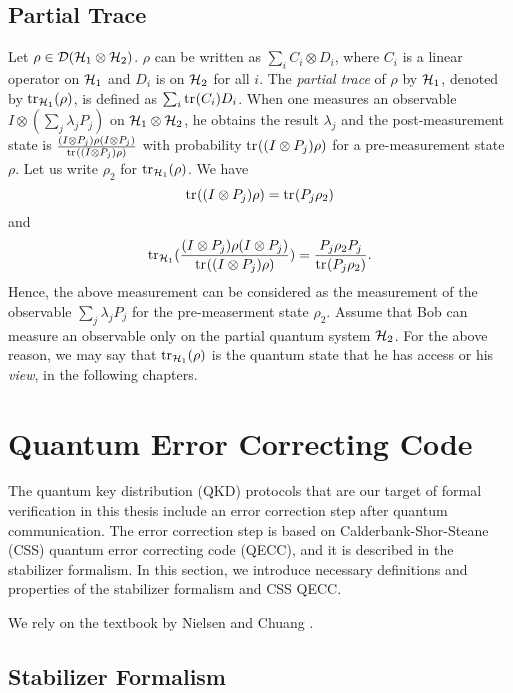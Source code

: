 \subsection*{Partial Trace}
Let $\rho \in \mathcal{D}(\mathcal{H}_1 \otimes \mathcal{H}_2)$.
$\rho$ can be written as $\sum_i C_i \otimes D_i$, where
$C_i$ is a linear operator on $\mathcal{H}_1$
and $D_i$ is on $\mathcal{H}_2$ for all $i$. 
The \emph{partial trace} of $\rho$ by $\mathcal{H}_1$, denoted
by $\mathrm{tr}_{\mathcal{H}_1}(\rho)$, is defined as
$\sum_i {\rm tr}_{}(C_i)D_i$. When one
measures an observable $I \otimes (\sum_j \lambda_j P_j)$ on
$\mathcal{H}_1 \otimes \mathcal{H}_2$, he obtains the result
$\lambda_j$ and the post-measurement state is
$\frac{(I \otimes P_j)\rho(I \otimes P_j)}
{{\rm tr}_{}((I \otimes P_j)\rho)}$
with probability ${\rm tr}_{}((I \otimes P_j)\rho)$ for
a pre-measurement state $\rho$.
Let us write $\rho_2$ for ${\rm tr}_{\mathcal{H}_1}(\rho)$.
We have
\[
 {\rm tr}_{}((I \otimes P_j)\rho) = {\rm tr}_{}(P_j\rho_2)
\]
and
\[
 {\rm tr}_{\mathcal{H}_1}(\frac{(I \otimes P_j)\rho(I \otimes P_j)}
 {{\rm tr}_{}((I \otimes P_j)\rho)})
=
 \frac{P_j \rho_2 P_j}
{{\rm tr}_{}(P_j\rho_2)}.
\]
Hence, the above measurement can be considered as the measurement of
the observable $\sum_j{\lambda_j}P_j$ for the 
pre-measerment state $\rho_2$.
Assume that Bob can measure an observable 
only on the partial quantum system $\mathcal{H}_2$.
For the above reason,
we may say that $\mathrm{tr}_{\mathcal{H}_1}(\rho)$
is the quantum state that he has access or
his {\it view}, in the following chapters.

\section{Quantum Error Correcting Code}
The quantum key distribution (QKD) protocols that are
our target of formal verification in this thesis include an error
correction step after quantum communication.
The error correction step is based on Calderbank-Shor-Steane (CSS)
\cite{CalderbankShor1996} quantum error correcting code (QECC), and
it is described in the stabilizer formalism. In this 
section, we introduce 
necessary definitions and properties of the stabilizer formalism and
CSS QECC.

We rely on the textbook by Nielsen and Chuang 
\cite[Chapter 10]{NielsenChuang-Kimura2004}.
\subsection{Stabilizer Formalism}
